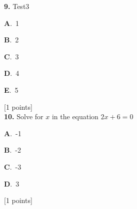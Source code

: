 \documentclass[12pt]{article}
\newcommand{\choice}[3]{%
  \noindent\textbf{#1}.~#2\hfill#3\par\vspace{0.25em}
}
\begin{document}
\noindent \textbf{\textenglish{9.}} {\textenglish{Test3}}

\noindent\choice{A}{{\textenglish{1}}}{}
\noindent\choice{B}{{\textenglish{2}}}{}
\noindent\choice{C}{{\textenglish{3}}}{}
\noindent\choice{D}{{\textenglish{4}}}{}
\noindent\choice{E}{{\textenglish{5}}}{}
\hfill {\textenglish{[1 points]}}\\[0.5em]

\noindent \textbf{\textenglish{10.}} {\textenglish{Solve for }}\(x \){\textenglish{ in the equation }}\(2x+6 = 0 \)

\noindent\choice{A}{{\textenglish{-1}}}{}
\noindent\choice{B}{{\textenglish{-2}}}{}
\noindent\choice{C}{{\textenglish{-3}}}{}
\noindent\choice{D}{{\textenglish{3}}}{}
\hfill {\textenglish{[1 points]}}\\[0.5em]
\end{document}
